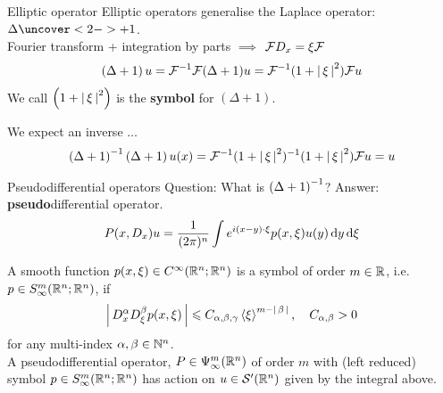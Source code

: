 \documentclass{beamer}
\begin{document}
\begin{frame}{Elliptic operator}
Elliptic operators generalise the Laplace operator: $\Delta \uncover<2->{+1}$. \\
Fourier transform + integration by parts $\implies$ $\F D_x = \xi \F $ 
\begin{align*}
\brac{\Delta + 1} u = \F^{-1} \F (\Delta + 1) u = \F^{-1} (1 + \abs{\xi}^2) \F u 
\end{align*}
We call $\brac{1 + \abs{\xi}^2} $ is the \textbf{symbol} for $(\Delta + 1)$.  

We expect an inverse $\dots$ 
\begin{align*}
\brac{\Delta + 1}^{-1} \brac{\Delta + 1} u(x) = \F^{-1} (1 + \abs{\xi}^2)^{-1} (1 + \abs{\xi}^2) \F u = u 
\end{align*}

\end{frame} 

\begin{frame}{Pseudodifferential operators}
Question: What is $\brac{\Delta + 1}^{-1}$? Answer: \textbf{pseudo}differential operator. 
\begin{align*}
P(x, D_x) u = \frac{1}{(2\pi)^n} \int e^{i(x - y) \cdot \xi} p(x, \xi) u(y) \d[y] \d[\xi]  \label{eq: action of symbol} 
\end{align*}
\begin{definition} A smooth function $p(x, \xi) \in C^\infty(\R^{n}; \R^n)$ is a symbol of order $m \in \R$, i.e. $p \in S^{m}_\infty(\R^{n}; \R^n)$, if
    \begin{align*}
    \abs{D^{\alpha}_x D^\beta_\xi p(x, \xi)} \leq C_{\alpha, \beta, \gamma}  \sym[\xi]^{m - \abs{\beta}}, \quad C_{\alpha, \beta}  > 0
    \end{align*}
    for any multi-index $\alpha, \beta \in \N^n$. \\
    
    A pseudodifferential operator, $P \in \Psi^{m}_{\infty}(\R^n)$ of order $m$ with (left reduced) symbol $p \in S^{m}_\infty(\R^{n}; \R^n)$ has action on $u \in \sch'(\R^n)$ given by the integral above. 
\end{definition}
\end{frame} 
\end{document}
